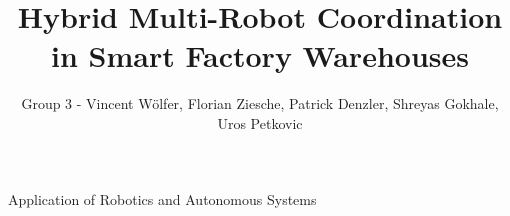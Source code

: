 \documentclass[journal]{IEEEtran}
\begin{document}
%
\title{Hybrid Multi-Robot Coordination in Smart Factory Warehouses}
%
%
%


\author{Group 3 - Vincent W\"olfer, Florian Ziesche, Patrick Denzler, Shreyas Gokhale, Uros Petkovic}

% 
%




%
{Application of Robotics and Autonomous Systems}



% 
\end{document}
